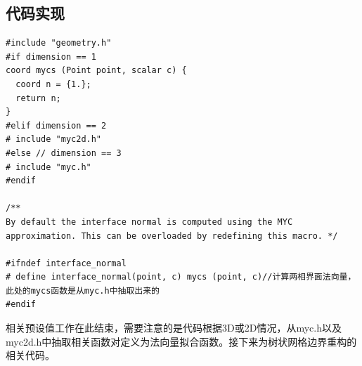 \documentclass[lang=cn,11pt,a4paper]{elegantpaper}
\begin{document}
\subsection{代码实现}
\begin{verbatim}
#include "geometry.h"
#if dimension == 1
coord mycs (Point point, scalar c) {
  coord n = {1.};
  return n;
}
#elif dimension == 2
# include "myc2d.h"
#else // dimension == 3
# include "myc.h"
#endif

/**
By default the interface normal is computed using the MYC
approximation. This can be overloaded by redefining this macro. */

#ifndef interface_normal
# define interface_normal(point, c) mycs (point, c)//计算两相界面法向量，此处的mycs函数是从myc.h中抽取出来的
#endif
\end{verbatim}
相关预设值工作在此结束，需要注意的是代码根据3D或2D情况，从myc.h以及myc2d.h中抽取相关函数对定义为法向量拟合函数。接下来为树状网格边界重构的相关代码。
\end{document}
